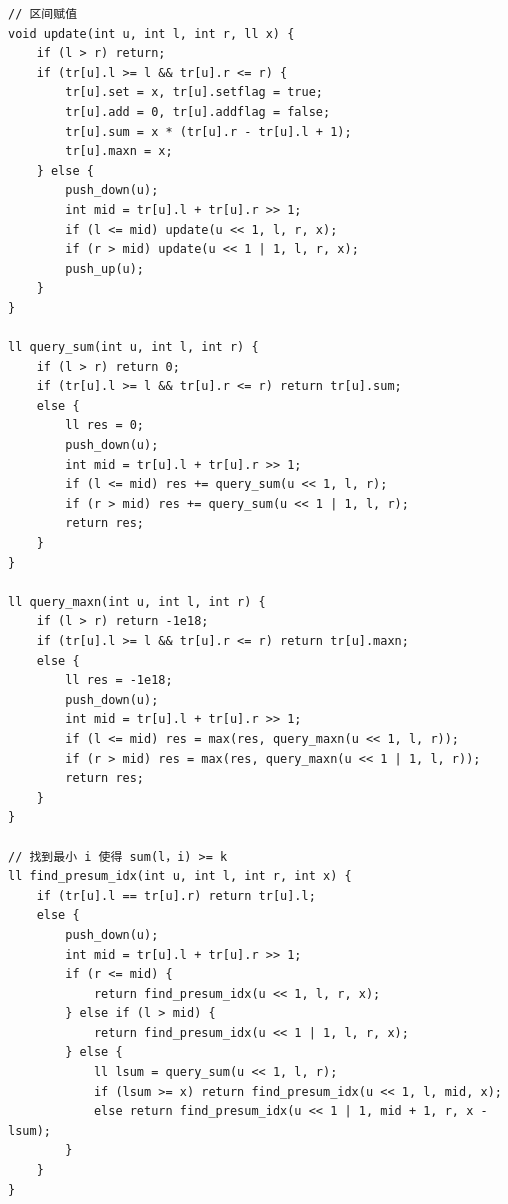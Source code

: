 \documentclass[UTF8, a4paper, titlepage, twoside]{ctexart}
\begin{document}
\begin{lstlisting}[style=cpp]
// 区间赋值
void update(int u, int l, int r, ll x) {
    if (l > r) return;
    if (tr[u].l >= l && tr[u].r <= r) {
        tr[u].set = x, tr[u].setflag = true;
        tr[u].add = 0, tr[u].addflag = false;
        tr[u].sum = x * (tr[u].r - tr[u].l + 1);
        tr[u].maxn = x;
    } else {
        push_down(u);
        int mid = tr[u].l + tr[u].r >> 1;
        if (l <= mid) update(u << 1, l, r, x);
        if (r > mid) update(u << 1 | 1, l, r, x);
        push_up(u);
    }
}

ll query_sum(int u, int l, int r) {
    if (l > r) return 0;
    if (tr[u].l >= l && tr[u].r <= r) return tr[u].sum;
    else {
        ll res = 0;
        push_down(u);
        int mid = tr[u].l + tr[u].r >> 1;
        if (l <= mid) res += query_sum(u << 1, l, r);
        if (r > mid) res += query_sum(u << 1 | 1, l, r);
        return res;
    }
}

ll query_maxn(int u, int l, int r) {
    if (l > r) return -1e18;
    if (tr[u].l >= l && tr[u].r <= r) return tr[u].maxn;
    else {
        ll res = -1e18;
        push_down(u);
        int mid = tr[u].l + tr[u].r >> 1;
        if (l <= mid) res = max(res, query_maxn(u << 1, l, r));
        if (r > mid) res = max(res, query_maxn(u << 1 | 1, l, r));
        return res;
    }
}

// 找到最小 i 使得 sum(l，i) >= k
ll find_presum_idx(int u, int l, int r, int x) {
    if (tr[u].l == tr[u].r) return tr[u].l;
    else {
        push_down(u);
        int mid = tr[u].l + tr[u].r >> 1;
        if (r <= mid) {
            return find_presum_idx(u << 1, l, r, x);
        } else if (l > mid) {
            return find_presum_idx(u << 1 | 1, l, r, x);
        } else {
            ll lsum = query_sum(u << 1, l, r);
            if (lsum >= x) return find_presum_idx(u << 1, l, mid, x);
            else return find_presum_idx(u << 1 | 1, mid + 1, r, x - lsum);
        }
    }
}    
\end{lstlisting}
\end{document}
